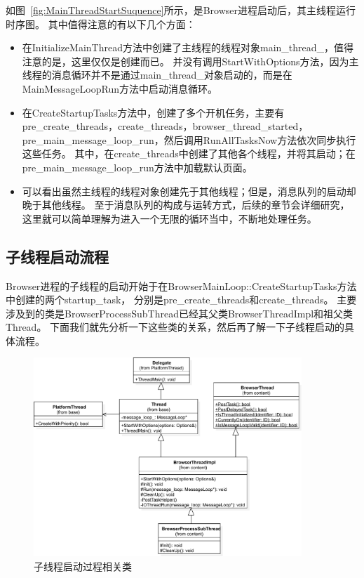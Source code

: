如图~\ref{fig:MainThreadStartSuquence}所示，是Browser进程启动后，其主线程运行时序图。
其中值得注意的有以下几个方面：
\begin{itemize}
  \item 在InitializeMainThread方法中创建了主线程的线程对象main\_thread\_，值得注意的是，这里仅仅是创建而已。
  并没有调用StartWithOptions方法，因为主线程的消息循环并不是通过main\_thread\_对象启动的，而是在MainMessageLoopRun方法中启动消息循环。
  \item 在CreateStartupTasks方法中，创建了多个开机任务，主要有pre\_create\_threads，create\_threads，browser\_thread\_started，
  pre\_main\_message\_loop\_run，然后调用RunAllTasksNow方法依次同步执行这些任务。
  其中，在create\_threads中创建了其他各个线程，并将其启动；在pre\_main\_message\_loop\_run方法中加载默认页面。
  \item 可以看出虽然主线程的线程对象创建先于其他线程；但是，消息队列的启动却晚于其他线程。
  至于消息队列的构成与运转方式，后续的章节会详细研究，这里就可以简单理解为进入一个无限的循环当中，不断地处理任务。
\end{itemize}

\subsection{子线程启动流程}
Browser进程的子线程的启动开始于在BrowserMainLoop::CreateStartupTasks方法中创建的两个startup\_task，
分别是pre\_create\_threads和create\_threads。
主要涉及到的类是BrowserProcessSubThread已经其父类BrowserThreadImpl和祖父类Thread。
下面我们就先分析一下这些类的关系，然后再了解一下子线程启动的具体流程。

\begin{figure}[H] 
  \centering 
  \includegraphics[width=0.90\textwidth]{image/process_study/SubThreadStartClass.pdf} 
  \caption{子线程启动过程相关类} \label{fig:SubThreadStartClass} 
\end{figure}

